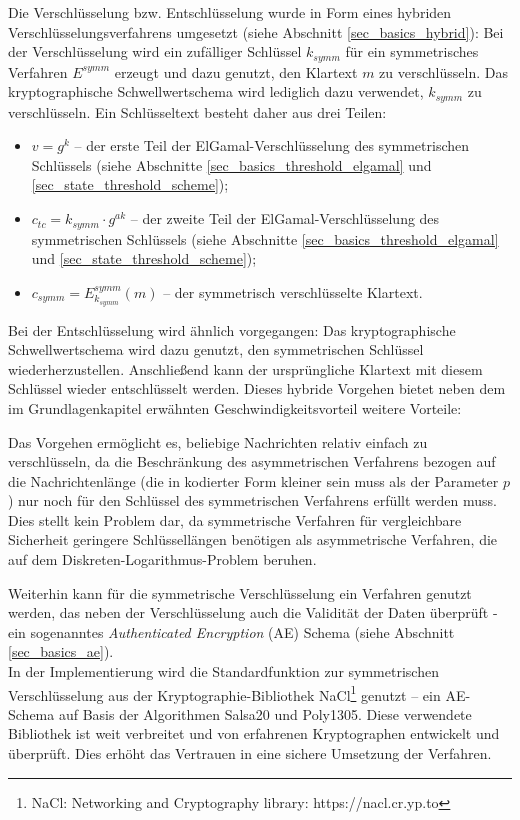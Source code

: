 Die Verschlüsselung bzw. Entschlüsselung wurde in Form eines hybriden Verschlüsselungsverfahrens umgesetzt (siehe Abschnitt \ref{sec_basics_hybrid}): Bei der Verschlüsselung wird ein zufälliger Schlüssel \(k_{symm}\) für ein symmetrisches Verfahren \(E^{symm}\) erzeugt und dazu genutzt, den Klartext \(m\) zu verschlüsseln. Das kryptographische Schwellwertschema wird lediglich dazu verwendet, \(k_{symm}\) zu verschlüsseln. Ein Schlüsseltext besteht daher aus drei Teilen: 
\begin{itemize}
  \item \(v = g^k\) -- der erste Teil der ElGamal-Verschlüsselung des symmetrischen Schlüssels (siehe Abschnitte \ref{sec_basics_threshold_elgamal} und \ref{sec_state_threshold_scheme});
  \item \(c_{tc} = k_{symm} \cdot g^{ak}\) -- der zweite Teil der ElGamal-Verschlüsselung des symmetrischen Schlüssels (siehe Abschnitte \ref{sec_basics_threshold_elgamal} und \ref{sec_state_threshold_scheme});
  \item \(c_{symm} = E^{symm}_{k_{symm}}(m)\) -- der symmetrisch verschlüsselte Klartext.
\end{itemize}

Bei der Entschlüsselung wird ähnlich vorgegangen: Das kryptographische Schwellwertschema wird dazu genutzt, den symmetrischen Schlüssel wiederherzustellen. Anschließend kann der ursprüngliche Klartext mit diesem Schlüssel wieder entschlüsselt werden. Dieses hybride Vorgehen bietet neben dem im Grundlagenkapitel erwähnten Geschwindigkeitsvorteil weitere Vorteile:

Das Vorgehen ermöglicht es, beliebige Nachrichten relativ einfach zu verschlüsseln, da die Beschränkung des asymmetrischen Verfahrens bezogen auf die Nachrichtenlänge (die in kodierter Form kleiner sein muss als der Parameter \(p\)) nur noch für den Schlüssel des symmetrischen Verfahrens erfüllt werden muss. Dies stellt kein Problem dar, da symmetrische Verfahren für vergleichbare Sicherheit geringere Schlüssellängen benötigen als asymmetrische Verfahren, die auf dem Diskreten-Logarithmus-Problem beruhen.

Weiterhin kann für die symmetrische Verschlüsselung ein Verfahren genutzt werden, das neben der Verschlüsselung auch die Validität der Daten überprüft - ein sogenanntes \textit{Authenticated Encryption} (AE) Schema (siehe Abschnitt \ref{sec_basics_ae}). \\
In der Implementierung wird die Standardfunktion zur symmetrischen Verschlüsselung aus der Kryptographie-Bibliothek NaCl\footnote{
  NaCl: Networking and Cryptography library: https://nacl.cr.yp.to
} 
genutzt -- ein AE-Schema auf Basis der Algorithmen Salsa20 und Poly1305. Diese verwendete Bibliothek ist weit verbreitet und von erfahrenen Kryptographen entwickelt und überprüft. Dies erhöht das Vertrauen in eine sichere Umsetzung der Verfahren.

